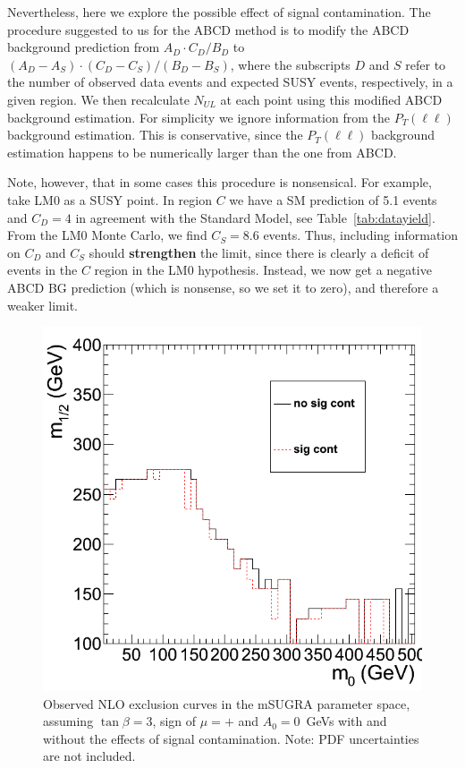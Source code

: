 Nevertheless, here we explore the possible effect of 
signal contamination.  The procedure suggested to us
for the ABCD method is to modify the 
ABCD background prediction from $A_D \cdot C_D/B_D$ to
$(A_D-A_S) \cdot (C_D-C_S) / (B_D - B_S)$, where the 
subscripts $D$ and $S$ refer to the number of observed data
events and expected SUSY events, respectively, in a given region. 
We then recalculate $N_{UL}$ at each point using this modified
ABCD background estimation.  For simplicity we ignore
information from the $P_T(\ell \ell)$
background estimation.  This is conservative, since
the $P_T(\ell\ell)$ background estimation happens to
be numerically larger than the one from ABCD. 

Note, however, that in some cases this procedure is 
nonsensical.  For example, take LM0 as a SUSY 
point.  In region $C$ we have a SM prediction of 5.1
events and $C_D = 4$ in agreement with the Standard Model,
see Table~\ref{tab:datayield}.  From the LM0 Monte Carlo,
we find $C_S = 8.6$ events.   Thus, including information
on $C_D$ and $C_S$ should {\bf strengthen} the limit, since there
is clearly a deficit of events in the $C$ region in the 
LM0 hypothesis.  Instead, we now get a negative ABCD 
BG prediction (which is nonsense, so we set it to zero),
and therefore a weaker limit.




\begin{figure}[tbh]
\begin{center}
\includegraphics[width=0.5\linewidth]{sigcont.png}
\caption{\label{fig:sigcont}\protect Observed NLO exclusion curves in the 
mSUGRA parameter space, 
assuming $\tan\beta=3$, sign of $\mu = +$ and $A_{0}=0$~GeVs
with and without the effects of signal contamination.
Note: PDF uncertainties are not included.}  
\end{center}
\end{figure}

